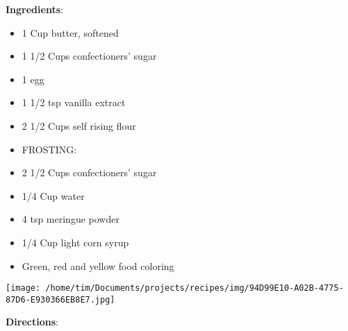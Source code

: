 \documentclass[11pt, twoside, openany]{book}
\begin{document}
\begin{minipage}[t]{0.8\linewidth}
\textbf{Ingredients}:\vspace{-3mm}
\begin{multicols}{2}
\begin{itemize}\setlength\itemsep{-1mm}
\item 1 Cup butter, softened
\item 1 1/2 Cups confectioners' sugar
\item 1 egg
\item 1 1/2 tsp vanilla extract
\item 2 1/2 Cups self rising flour
\item FROSTING:
\item 2 1/2 Cups confectioners' sugar
\item 1/4 Cup water
\item 4 tsp meringue powder
\item 1/4 Cup light corn syrup
\item Green, red and yellow food coloring
\end{itemize}
\end{multicols}
\end{minipage}
\begin{minipage}[t]{0.2\linewidth}
\centering \strut\vspace*{-\baselineskip}\newline
\texttt{[image: /home/tim/Documents/projects/recipes/img/94D99E10-A02B-4775-87D6-E930366EB8E7.jpg]}\\
\end{minipage}\vspace{3mm}
\textbf{Directions}:
\end{document}
